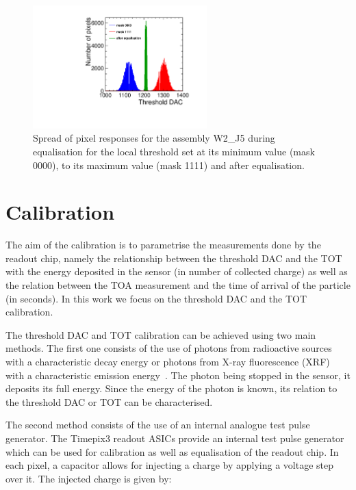 \begin{figure}[htbp] 
  \centering
  \includegraphics[width=0.6\textwidth]{./figures/Calibration/THLequalisation_W2_J5.pdf}
  \caption{Spread of pixel responses for the assembly W2\_J5 during
    equalisation for the local threshold set at its minimum value
    (mask 0000), to its maximum value (mask 1111) and after
    equalisation.}
  \label{fig:THLequalisation}
\end{figure}

\section{Calibration} \label{sec:calibration} 

The aim of the calibration is to parametrise the measurements done by
the readout chip, namely the relationship between the threshold DAC
and the TOT with the energy deposited in the sensor (in number of
collected charge) as well as the relation between the TOA measurement
and the time of arrival of the particle (in seconds). In this work we
focus on the threshold DAC and the TOT calibration.

The threshold DAC and TOT calibration can be achieved using two main
methods. The first one consists of the use of photons from radioactive
sources with a characteristic decay energy or photons from X-ray
fluorescence (XRF) with a characteristic emission
energy~\cite{AlipourTehrani:2054922}. The photon being stopped in the
sensor, it deposits its full energy. Since the energy of the photon is
known, its relation to the threshold DAC or TOT can be characterised. 

The second method consists of the use of an internal analogue test
pulse generator. The Timepix3 readout ASICs provide an internal test
pulse generator which can be used for calibration as well as
equalisation of the readout chip. In each pixel, a capacitor allows
for injecting a charge by applying a voltage step over it. The
injected charge is given by:

